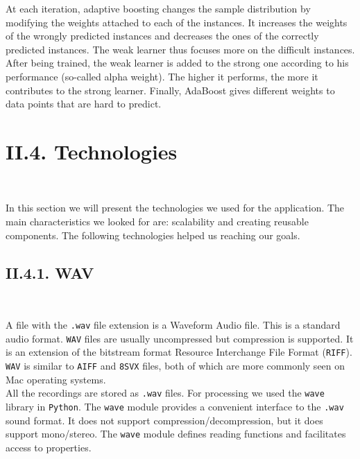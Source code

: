 \documentclass[11pt, a4papper]{report}
\theoremstyle{plain}
\theoremstyle{definition}
\theoremstyle{definition}
\theoremstyle{proposition}
\begin{document}
At each iteration, adaptive boosting changes the sample distribution by modifying the weights attached to each of the instances. It increases the weights of the wrongly predicted instances and decreases the ones of the correctly predicted instances. The weak learner thus focuses more on the difficult instances. After being trained, the weak learner is added to the strong one according to his performance (so-called alpha weight). The higher it performs, the more it contributes to the strong learner. Finally, AdaBoost gives different weights to data points that are hard to predict. \cite{28}



\newpage

\section*{II.4. Technologies}

\

In this section we will present the technologies we used for the application. The main characteristics we looked for are: scalability and creating reusable components. The following technologies helped us reaching our goals.
\\

\subsection*{II.4.1. WAV}

\

A file with the \verb|.wav| file extension is a Waveform Audio file. This is a standard audio format. \verb|WAV| files are usually uncompressed but compression is supported. It is an extension of the bitstream format Resource Interchange File Format (\verb|RIFF|). \verb|WAV| is similar to \verb|AIFF| and \verb|8SVX| files, both of which are more commonly seen on Mac operating systems. \cite{13}
\\

All the recordings are stored as \verb|.wav| files. For processing we used the \verb|wave| library in \verb|Python|. The \verb|wave| module provides a convenient interface to the \verb|.wav| sound format. It does not support compression/decompression, but it does support mono/stereo. The \verb|wave| module defines reading functions and facilitates access to properties.
\
\end{document}
